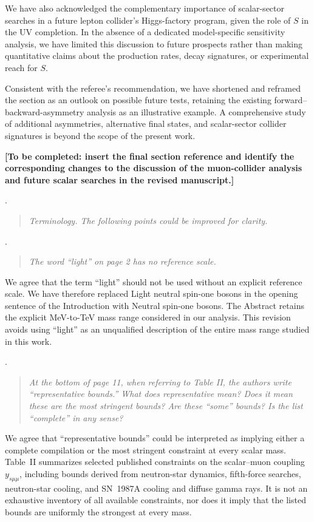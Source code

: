 \documentclass[12pt,a4paper]{article}
\begin{document}
We have also acknowledged the complementary importance of scalar-sector searches in a future lepton collider's Higgs-factory program, given the role of \(S\) in the UV completion. In the absence of a dedicated model-specific sensitivity analysis, we have limited this discussion to future prospects rather than making quantitative claims about the production rates, decay signatures, or experimental reach for \(S\).

Consistent with the referee's recommendation, we have shortened and reframed the section as an outlook on possible future tests, retaining the existing forward--backward-asymmetry analysis as an illustrative example. A comprehensive study of additional asymmetries, alternative final states, and scalar-sector collider signatures is beyond the scope of the present work.

\textbf{[To be completed: insert the final section reference and identify the corresponding changes to the discussion of the muon-collider analysis and future scalar searches in the revised manuscript.]}

\medskip
{}. \begin{quote}\itshape
Terminology. The following points could be improved for clarity.
\end{quote}

\medskip
{}. \begin{quote}\itshape
The word ``light'' on page 2 has no reference scale.
\end{quote}

We agree that the term ``light'' should not be used without an explicit reference scale. We have therefore replaced Light neutral spin-one bosons in the opening sentence of the Introduction with Neutral spin-one bosons. The Abstract retains the explicit MeV-to-TeV mass range considered in our analysis. This revision avoids using ``light'' as an unqualified description of the entire mass range studied in this work.

\medskip
{}. \begin{quote}\itshape
At the bottom of page 11, when referring to Table II, the authors write ``representative bounds.'' What does representative mean? Does it mean these are the most stringent bounds? Are these ``some'' bounds? Is the list ``complete'' in any sense?
\end{quote}

We agree that ``representative bounds'' could be interpreted as implying either a complete compilation or the most stringent constraint at every scalar mass. Table~II summarizes selected published constraints on the scalar--muon coupling \(y_{s\mu\mu}\), including bounds derived from neutron-star dynamics, fifth-force searches, neutron-star cooling, and SN~1987A cooling and diffuse gamma rays. It is not an exhaustive inventory of all available constraints, nor does it imply that the listed bounds are uniformly the strongest at every mass.
\end{document}
